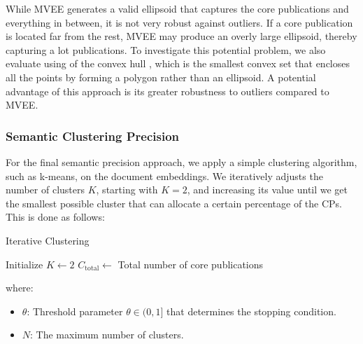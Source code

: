 While MVEE generates a valid ellipsoid that captures the core publications and everything in between, it is not very robust against outliers. If a core publication is located far from the rest, MVEE may produce an overly large ellipsoid, thereby capturing a lot publications. To investigate this potential problem, we also evaluate using of the convex hull \autocite{Kirkpatrick1986}, which is the smallest convex set that encloses all the points by forming a polygon rather than an ellipsoid. A potential advantage of this approach is its greater robustness to outliers compared to MVEE.

\subsubsection{Semantic Clustering Precision}

For the final semantic precision approach, we apply a simple clustering algorithm, such as k-means, on the document embeddings. We iteratively adjusts the number of clusters $K$, starting with $K=2$, and increasing its value until we get the smallest possible cluster that can allocate a certain percentage of the CPs. This is done as follows:

\begin{algorithm}
	\caption{Iterative Clustering}
	Initialize $K \gets 2$ \;
	$C_{\text{total}} \gets$ Total number of core publications\;
	\label{algo:sp-clustering}
\end{algorithm}

\noindent where:
\begin{itemize}
	\item \( \theta \): Threshold parameter $\theta \in (0, 1]$ that determines the stopping condition.
	\item $N$: The maximum number of clusters.
\end{itemize}

